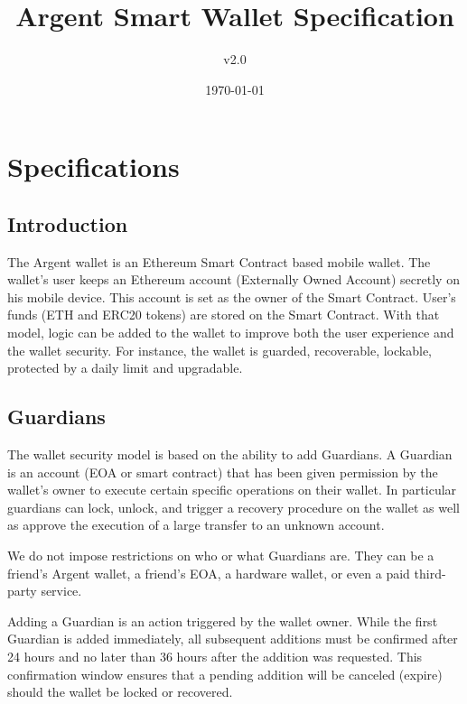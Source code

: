 \documentclass[12pt]{article}
\title{Argent Smart Wallet Specification}
\author{v2.0}
\date{\today}
\begin{document}
\maketitle

\section{Specifications}

\subsection{Introduction}

The Argent wallet is an Ethereum Smart Contract based mobile wallet. The wallet's user keeps an Ethereum account (Externally Owned Account) secretly on his mobile device. This account is set as the owner of the Smart Contract. User's funds (ETH and ERC20 tokens) are stored on the Smart Contract. With that model, logic can be added to the wallet to improve both the user experience and the wallet security. For instance, the wallet is guarded, recoverable, lockable, protected by a daily limit and upgradable.

\subsection{Guardians}

The wallet security model is based on the ability to add Guardians. A Guardian is an account (EOA or smart contract) that has been given permission by the wallet's owner to execute certain specific operations on their wallet. In particular guardians can lock, unlock, and trigger a recovery procedure on the wallet as well as approve the execution of a large transfer to an unknown account.

We do not impose restrictions on who or what Guardians are. They can be a friend's Argent wallet, a friend's EOA, a hardware wallet, or even a paid third-party service.

Adding a Guardian is an action triggered by the wallet owner. While the first Guardian is added immediately, all subsequent additions must be confirmed after 24 hours and no later than 36 hours after the addition was requested. This confirmation window ensures that a pending addition will be canceled (expire) should the wallet be locked or recovered.
\end{document}
